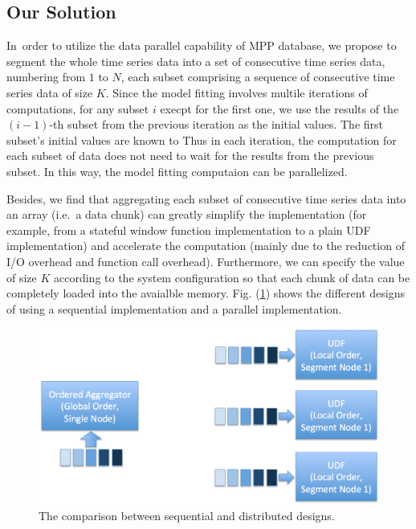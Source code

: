 \documentclass[english,10pt]{llncs}
\begin{document}
\subsection{Our Solution}


In\ order to utilize the data parallel capability of MPP database, we
propose to segment the whole time series data into a set of
consecutive time series data, numbering from $1$ to $N$, each subset
comprising a sequence of consecutive time series data of size
$K$. Since the model fitting involves multile iterations of
computations, for any subset $i$ execpt for the first one, we use the
results of the $(i-1)$-th subset from the previous iteration as the
initial values. The first subset's initial values are known to Thus in
each iteration, the computation for each subset of data does not need
to wait for the results from the previous subset. In this way, the
model fitting computaion can be parallelized. 

Besides, we find that aggregating each subset of consecutive time
series data into an array (i.e.\ a data chunk) can greatly simplify
the implementation (for example, from a stateful window function
implementation to a plain UDF implementation) and accelerate the
computation (mainly due to the reduction of I/O overhead and function
call overhead). Furthermore, we can specify the value of size $K$
according to the system configuration so that each chunk of data can
be completely loaded into the avaialble
memory. Fig. (\ref{fig:seq_vs_dist}) shows the different designs of
using a sequential implementation and a parallel implementation. 

\begin{figure}[ht]
  \begin{centering}
    \includegraphics[scale=0.25]{sequential_vs_distributed.png}
  \end{centering}
  \caption{\label{fig:seq_vs_dist} The comparison between sequential
    and distributed designs. }
\end{figure}
\end{document}
